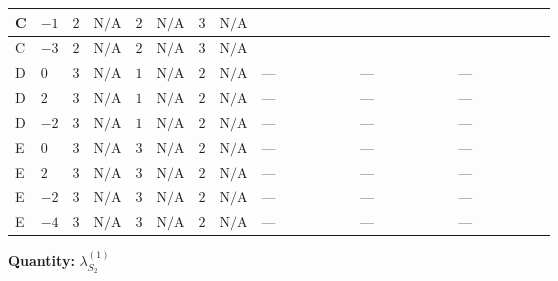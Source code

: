 \documentclass[8pt]{article}
\begin{document}
\begin{landscape}
\begin{longtable}{@{}llcccccc >{\raggedright\arraybackslash}p{0.21\linewidth} >{\raggedright\arraybackslash}p{0.21\linewidth} >{\raggedright\arraybackslash}p{0.21\linewidth}@{}}
\midrule
C & $-1$ & $2$ & $\text{N/A}$ & $2$ & $\text{N/A}$ & $3$ & $\text{N/A}$ & \scriptsize\adjustbox{max width=\linewidth}{$\begin{gathered} +{g_1}^2 \left(\frac{3 {g_2}^2}{2}-3 {\lambda_{S_2}^{(1)}}\right)\end{gathered}$} & \scriptsize\adjustbox{max width=\linewidth}{$\begin{gathered} +\frac{3 {g_1}^4}{4}\end{gathered}$} & \scriptsize\adjustbox{max width=\linewidth}{$\begin{gathered} +\frac{{\lambda_{12}^{(A)}}^2}{4}\end{gathered}$} \\
\midrule
C & $-3$ & $2$ & $\text{N/A}$ & $2$ & $\text{N/A}$ & $3$ & $\text{N/A}$ & \scriptsize\adjustbox{max width=\linewidth}{$\begin{gathered} +{g_1}^2 \left(\frac{3 {g_2}^2}{2}-3 {\lambda_{S_2}^{(1)}}\right)\end{gathered}$} & \scriptsize\adjustbox{max width=\linewidth}{$\begin{gathered} +\frac{3 {g_1}^4}{4}\end{gathered}$} & \scriptsize\adjustbox{max width=\linewidth}{$\begin{gathered} +\frac{{\lambda_{12}^{(A)}}^2}{4}\end{gathered}$} \\
\midrule
D & $0$ & $3$ & $\text{N/A}$ & $1$ & $\text{N/A}$ & $2$ & $\text{N/A}$ & --- & --- & --- \\
\midrule
D & $2$ & $3$ & $\text{N/A}$ & $1$ & $\text{N/A}$ & $2$ & $\text{N/A}$ & --- & --- & --- \\
\midrule
D & $-2$ & $3$ & $\text{N/A}$ & $1$ & $\text{N/A}$ & $2$ & $\text{N/A}$ & --- & --- & --- \\
\midrule
E & $0$ & $3$ & $\text{N/A}$ & $3$ & $\text{N/A}$ & $2$ & $\text{N/A}$ & --- & --- & --- \\
\midrule
E & $2$ & $3$ & $\text{N/A}$ & $3$ & $\text{N/A}$ & $2$ & $\text{N/A}$ & --- & --- & --- \\
\midrule
E & $-2$ & $3$ & $\text{N/A}$ & $3$ & $\text{N/A}$ & $2$ & $\text{N/A}$ & --- & --- & --- \\
\midrule
E & $-4$ & $3$ & $\text{N/A}$ & $3$ & $\text{N/A}$ & $2$ & $\text{N/A}$ & --- & --- & --- \\
\midrule
\bottomrule
\end{longtable}
\clearpage
\noindent\textbf{Quantity: }$\lambda_{S_2}^{(1)}$\par\smallskip

\end{landscape}
\end{document}
